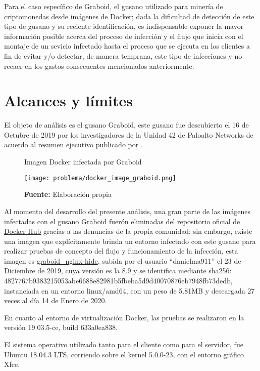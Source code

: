 \documentclass[../main/main.tex]{subfiles}
\begin{document}
  Para el caso específico de Graboid, el gusano utilizado para minería de criptomonedas desde imágenes de Docker; dada la dificultad de detección de este tipo de gusano y su reciente identificación, es indispensable exponer la mayor información posible acerca del proceso de infección y el flujo que inicia con el montaje de un sevicio infectado hasta el proceso que se ejecuta en los clientes a fin de evitar y/o detectar, de manera temprana, este tipo de infecciones y no recaer en los gastos consecuentes mencionados anteriormente.

  \section{Alcances y límites}

  El objeto de análisis es el gusano Graboid, este gusano fue descubierto el 16 de Octubre de 2019 por los investigadores de la Unidad 42 de Paloalto Networks de acuerdo al resumen ejecutivo publicado por \cite{web:graboid_paloalto}.

  \begin{figure}[ht]
    \centering
    \caption{Imagen Docker infectada por Graboid}
    \texttt{[image: problema/docker\_image\_graboid.png]}
    \caption*{\textbf{Fuente:} Elaboración propia}
  \end{figure}

  Al momento del desarrollo del presente análisis, una gran parte de las imágenes infectadas con el gusano Graboid fuerón eliminadas del repositorio oficial de \href{https://hub.docker.com/}{Docker Hub} gracias a las denuncias de la propia comunidad; sin embargo, existe una imagen que explícitamente brinda un entorno infectado con este gusano para realizar pruebas de concepto del flujo y funcionamiento de la infección, esta imagen es \href{https://hub.docker.com/r/danielma911/graboid\_nginx-hide}{graboid\_nginx-hide}, subida por el usuario ``danielma911'' el 23 de Diciembre de 2019, cuya versión es la 8.9 y se identifica mediante sha256: 4827767b9383215053abe6688e82981b5fbeba5d9d40070876eb7948fb73dedb, instanciada en un entorno linux/amd64, con un peso de 5.81MB y descargada 27 veces al día 14 de Enero de 2020.

  En cuanto al entorno de virtualización Docker, las pruebas se realizaron en la versión 19.03.5-ce, build 633a0ea838.

  El sistema operativo utilizado tanto para el cliente como para el servidor, fue Ubuntu 18.04.3 LTS, corriendo sobre el kernel 5.0.0-23, con el entorno gráfico Xfce.
\end{document}

